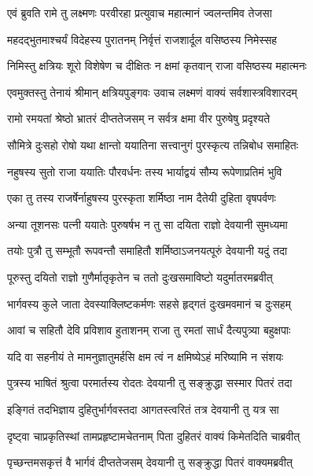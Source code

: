 
\twolineshloka
{एवं ब्रुवति रामे तु लक्ष्मणः परवीरहा}
{प्रत्युवाच महात्मानं ज्वलन्तमिव तेजसा} %

\twolineshloka
{महदद्भुतमाश्चर्यं विदेहस्य पुरातनम्}
{निर्वृत्तं राजशार्दूल वसिष्ठस्य निमेस्सह} %

\twolineshloka
{निमिस्तु क्षत्रियः शूरो विशेषेण च दीक्षितः}
{न क्षमां कृतवान् राजा वसिष्ठस्य महात्मनः} %

\twolineshloka
{एवमुक्तस्तु तेनायं श्रीमान् क्षत्रियपुङ्गवः}
{उवाच लक्ष्मणं वाक्यं सर्वशास्त्रविशारदम्} %

\twolineshloka
{रामो रमयतां श्रेष्ठो भ्रातरं दीप्ततेजसम्}
{न सर्वत्र क्षमा वीर पुरुषेषु प्रदृश्यते} %

\twolineshloka
{सौमित्रे दुःसहो रोषो यथा क्षान्तो ययातिना}
{सत्त्वानुगं पुरस्कृत्य तन्निबोध समाहितः} %

\twolineshloka
{नहुषस्य सुतो राजा ययातिः पौरवर्धनः}
{तस्य भार्याद्वयं सौम्य रूपेणाप्रतिमं भुवि} %

\twolineshloka
{एका तु तस्य राजर्षेर्नाहुषस्य पुरस्कृता}
{शर्मिष्ठा नाम दैतेयी दुहिता वृषपर्वणः} %

\twolineshloka
{अन्या तूशनसः पत्नी ययातेः पुरुषर्षभ}
{न तु सा दयिता राज्ञो देवयानी सुमध्यमा} %

\twolineshloka
{तयोः पुत्रौ तु सम्भूतौ रूपवन्तौ समाहितौ}
{शर्मिष्ठाऽजनयत्पूरुं देवयानी यदुं तदा} %

\twolineshloka
{पूरुस्तु दयितो राज्ञो गुणैर्मातृकृतेन च}
{ततो दुःखसमाविष्टो यदुर्मातरमब्रवीत्} %

\twolineshloka
{भार्गवस्य कुले जाता देवस्याक्लिष्टकर्मणः}
{सहसे हृद्गतं दुःखमवमानं च दुःसहम्} %

\twolineshloka
{आवां च सहितौ देवि प्रविशाव हुताशनम्}
{राजा तु रमतां सार्धं दैत्यपुत्र्या बहुक्षपाः} %

\twolineshloka
{यदि वा सहनीयं ते मामनुज्ञातुमर्हसि}
{क्षम त्वं न क्षमिष्येऽहं मरिष्यामि न संशयः} %

\twolineshloka
{पुत्रस्य भाषितं श्रुत्वा परमार्तस्य रोदतः}
{देवयानी तु सङ्क्रुद्धा सस्मार पितरं तदा} %

\twolineshloka
{इङ्गितं तदभिज्ञाय दुहितुर्भार्गवस्तदा}
{आगतस्त्वरितं तत्र देवयानी तु यत्र सा} %

\twolineshloka
{दृष्ट्वा चाप्रकृतिस्थां तामप्रहृष्टामचेतनाम्}
{पिता दुहितरं वाक्यं किमेतदिति चाब्रवीत्} %

\twolineshloka
{पृच्छन्तमसकृत्तं वै भार्गवं दीप्ततेजसम्}
{देवयानी तु सङ्क्रुद्धा पितरं वाक्यमब्रवीत्} %

